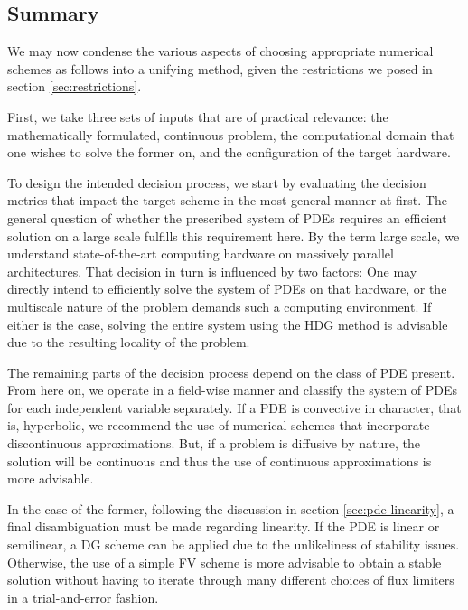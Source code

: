 \documentclass[asi,article,submit,moreauthors]{Definitions/mdpi}
\begin{document}
\subsection{Summary}

We may now condense the various aspects of choosing appropriate numerical schemes as follows into a unifying method, given the restrictions we posed in section \ref{sec:restrictions}.

First, we take three sets of inputs that are of practical relevance: the mathematically formulated, continuous problem, the computational domain that one wishes to solve the former on, and the configuration of the target hardware.

To design the intended decision process, we start by evaluating the decision metrics that impact the target scheme in the most general manner at first.
The general question of whether the prescribed system of PDEs requires an efficient solution on a large scale fulfills this requirement here.
By the term large scale, we understand state-of-the-art computing hardware on massively parallel architectures.
That decision in turn is influenced by two factors: One may directly intend to efficiently solve the system of PDEs on that hardware, or the multiscale nature of the problem demands such a computing environment.
If either is the case, solving the entire system using the HDG method is advisable due to the resulting locality of the problem.

The remaining parts of the decision process depend on the class of PDE present.
From here on, we operate in a field-wise manner and classify the system of PDEs for each independent variable separately.
If a PDE is convective in character, that is, hyperbolic, we recommend the use of numerical schemes that incorporate discontinuous approximations.
But, if a problem is diffusive by nature, the solution will be continuous and thus the use of continuous approximations is more advisable.

In the case of the former, following the discussion in section \ref{sec:pde-linearity}, a final disambiguation must be made regarding linearity.
If the PDE is linear or semilinear, a DG scheme can be applied due to the unlikeliness of stability issues.
Otherwise, the use of a simple FV scheme is more advisable to obtain a stable solution without having to iterate through many different choices of flux limiters in a trial-and-error fashion.
\end{document}
